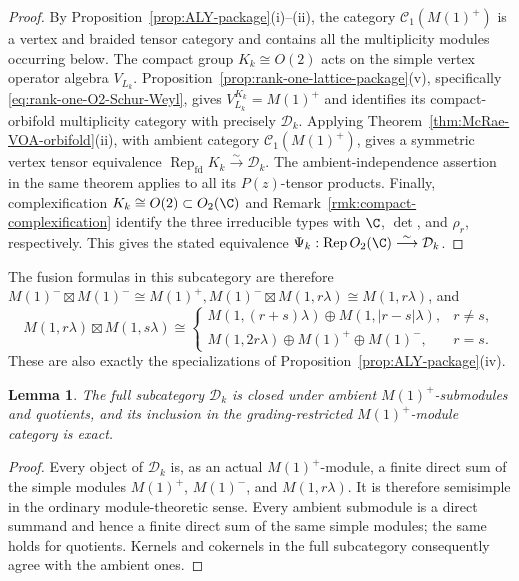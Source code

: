 \documentclass[12pt,leqno]{amsart}
\numberwithin{equation}{section} \newtheorem{thm}{Theorem}[section] \newtheorem{lem}[thm]{Lemma} \newtheorem{ex}[thm]{Example} \newtheorem{prop}[thm]{Proposition} \newtheorem{cor}[thm]{Corollary} \newtheorem{defi}[thm]{Definition} \newtheorem{rmk}[thm]{Remark} \newtheorem{notation}[thm]{Notation}
\newcommand{\Rep}{\operatorname{Rep}}
\newcommand{\Dk}{\mathcal D_k}
\newcommand{\Otwo}{O_2(\C)}
\begin{document}
\begin{proof}
By Proposition~\ref{prop:ALY-package}(i)--(ii), the category $\mathcal C_1(M(1)^+)$ is a vertex and braided tensor category and contains all the multiplicity modules occurring below. The compact group \(K_k\cong O(2)\) acts on the simple vertex operator algebra $V_{L_k}$. Proposition~\ref{prop:rank-one-lattice-package}(v), specifically \eqref{eq:rank-one-O2-Schur-Weyl}, gives \(V_{L_k}^{K_k}=M(1)^+\) and identifies its compact-orbifold multiplicity category with precisely $\Dk$. Applying Theorem~\ref{thm:McRae-VOA-orbifold}(ii), with ambient category $\mathcal C_1(M(1)^+)$, gives a symmetric vertex tensor equivalence \(\Rep_{\mathrm{fd}}K_k\overset{\sim}{\longrightarrow}\Dk\). The ambient-independence assertion in the same theorem applies to all its $P(z)$-tensor products. Finally, complexification $K_k\cong O(2)\subset \Otwo$ and Remark~\ref{rmk:compact-complexification} identify the three irreducible types with $\C$, $\det$, and $\rho_r$, respectively. This gives the stated equivalence \(\Psi_k:\Rep\Otwo\overset{\sim}{\longrightarrow}\Dk\).
\end{proof}

The fusion formulas in this subcategory are therefore \(M(1)^-\boxtimes M(1)^-\cong M(1)^+, M(1)^-\boxtimes M(1,r\lambda)\cong M(1,r\lambda)\), and
\[
M(1,r\lambda)\boxtimes M(1,s\lambda)\cong
\begin{cases}
M(1,(r+s)\lambda)\oplus M(1,|r-s|\lambda),&r\ne s,\\
M(1,2r\lambda)\oplus M(1)^+\oplus M(1)^-,&r=s.
\end{cases}
\]
These are also exactly the specializations of Proposition~\ref{prop:ALY-package}(iv).

\begin{lem}\label{lem:Dk-ambient-Serre}
The full subcategory $\Dk$ is closed under ambient $M(1)^+$-submodules and quotients, and its inclusion in the grading-restricted $M(1)^+$-module category is exact.
\end{lem}

\begin{proof}
Every object of $\Dk$ is, as an actual $M(1)^+$-module, a finite direct sum of the simple modules $M(1)^+$, $M(1)^-$, and $M(1,r\lambda)$. It is therefore semisimple in the ordinary module-theoretic sense. Every ambient submodule is a direct summand and hence a finite direct sum of the same simple modules; the same holds for quotients. Kernels and cokernels in the full subcategory consequently agree with the ambient ones.
\end{proof}
\end{document}
